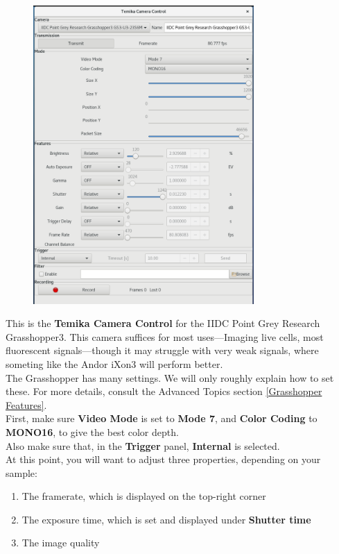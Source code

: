 \documentclass{report}
\begin{document}
\begin{figure}[h!]
\centering
\includegraphics[width=0.75\textwidth]{grasshopper}
\end{figure}

This is the \textbf{Temika Camera Control} for the IIDC Point Grey Research Grasshopper3. This camera suffices for most uses---Imaging live cells, most fluorescent signals---though it may struggle with very weak signals, where someting like the Andor iXon3 will perform better.\\

The Grasshopper has many settings. We will only roughly explain how to set these. For more details, consult the Advanced Topics section \ref{Grasshopper Features}.\\

First, make sure \textbf{Video Mode} is set to \textbf{Mode 7}, and \textbf{Color Coding} to \textbf{MONO16}, to give the best color depth.\\

Also make sure that, in the \textbf{Trigger} panel, \textbf{Internal} is selected.\\

At this point, you will want to adjust three properties, depending on your sample:
\begin{enumerate}
	\item The framerate, which is displayed on the top-right corner
	\item The exposure time, which is set and displayed under \textbf{Shutter time}
	\item The image quality
\end{enumerate}
\end{document}
